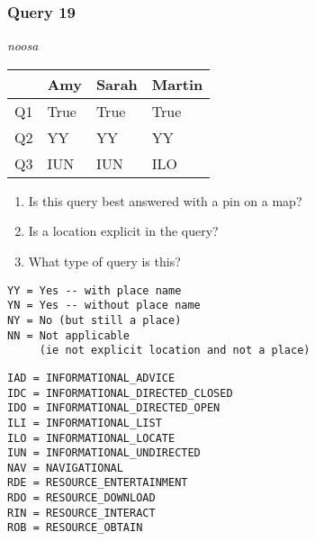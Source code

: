 \begin{frame}[fragile]
\frametitle{Query 19}
\vspace{1em}

\emph{noosa}

\vfill

\begin{table}
  \centering
  \begin{tabular}{ l l l l }
    & \textbf{Amy} & \textbf{Sarah} & \textbf{Martin}\\
    \toprule
    Q1 & True & True & True\\
Q2 & YY & YY & YY\\
Q3 & IUN & IUN & ILO\\
    \bottomrule
  \end{tabular}
\end{table}

\vfill

\tiny{

\begin{enumerate}
\item Is this query best answered with a pin on a map?
\item Is a location explicit in the query?
\item What type of query is this?
\end{enumerate}

\vfill

\begin{multicols}{2}
\begin{verbatim}
YY = Yes -- with place name
YN = Yes -- without place name
NY = No (but still a place)
NN = Not applicable 
     (ie not explicit location and not a place)
\end{verbatim}

\columnbreak
\begin{verbatim}
IAD = INFORMATIONAL_ADVICE
IDC = INFORMATIONAL_DIRECTED_CLOSED
IDO = INFORMATIONAL_DIRECTED_OPEN
ILI = INFORMATIONAL_LIST
ILO = INFORMATIONAL_LOCATE
IUN = INFORMATIONAL_UNDIRECTED
NAV = NAVIGATIONAL
RDE = RESOURCE_ENTERTAINMENT
RDO = RESOURCE_DOWNLOAD
RIN = RESOURCE_INTERACT
ROB = RESOURCE_OBTAIN
\end{verbatim}
\end{multicols}
}

\end{frame}


